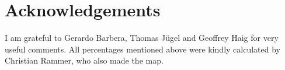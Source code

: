 \documentclass[output=paper,colorlinks,citecolor=brown]{langscibook}
\begin{document}
\section*{Acknowledgements}

I am grateful to Gerardo Barbera, Thomas Jügel and Geoffrey Haig for very useful comments. All percentages mentioned above were kindly calculated by Christian Rammer, who also made the map.




{\sloppy\printbibliography[heading=subbibliography,notkeyword=this]}
\end{document}
